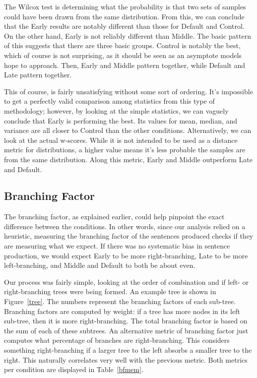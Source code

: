 The Wilcox test is determining what the probability is that two sets of samples could have been drawn from the same distribution. From this, we can conclude that the Early results are notably different than those for Default and Control. On the other hand, Early is not reliably different than Middle. The basic pattern of this suggests that there are three basic groups. Control is notably the best, which of course is not surprising, as it should be seen as an asymptote models hope to approach. Then, Early and Middle pattern together, while Default and Late pattern together. 

This of course, is fairly unsatisfying without some sort of ordering. It's impossible to get a perfectly valid comparison among statistics from this type of methodology; however, by looking at the simple statistics, we can vaguely conclude that Early is performing the best. Its values for mean, median, and variance are all closer to Control than the other conditions. Alternatively, we can look at the actual w-scores. While it is not intended to be used as a distance metric for distributions, a higher value means it's less probable the samples are from the same distribution. Along this metric, Early and Middle outperform Late and Default. 

\subsection{Branching Factor}
The branching factor, as explained earlier, could help pinpoint the exact difference between the conditions. In other words, since our analysis relied on a heuristic, measuring the branching factor of the sentences produced checks if they are measuring what we expect. If there was no systematic bias in sentence production, we would expect Early to be more right-branching, Late to be more left-branching, and Middle and Default to both be about even. 

Our process was fairly simple, looking at the order of combination and if left- or right-branching trees were being formed. An example tree is shown in Figure~\ref{tree}. The numbers represent the branching factors of each sub-tree. Branching factors are computed by weight: if a tree has more nodes in its left sub-tree, then it is more right-branching. The total branching factor is based on the sum of each of these subtrees. An alternative metric of branching factor just computes what percentage of branches are right-branching. This considers something right-branching if a larger tree to the left absorbs a smaller tree to the right. This naturally correlates very well with the previous metric. Both metrics per condition are displayed in Table~\ref{bfmem}. 


